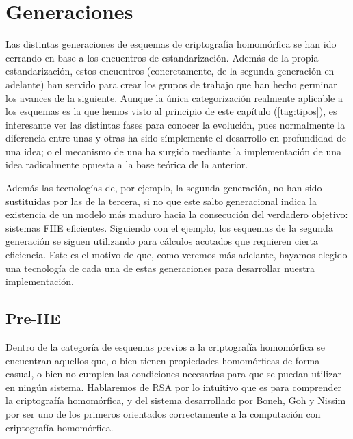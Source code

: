 \section{Generaciones}

Las distintas generaciones de esquemas de criptografía homomórfica se han ido cerrando en base a los encuentros de estandarización. Además de la propia estandarización, estos encuentros (concretamente, de la segunda generación en adelante) han servido para crear los grupos de trabajo que han hecho germinar los avances de la siguiente. Aunque la única categorización realmente aplicable a los esquemas es la que hemos visto al principio de este capítulo (\ref{tag:tipos}), es interesante ver las distintas fases para conocer la evolución, pues normalmente la diferencia entre unas y otras ha sido símplemente el desarrollo en profundidad de una idea; o el mecanismo de una ha surgido mediante la implementación de una idea radicalmente opuesta a la base teórica de la anterior.


Además las tecnologías de, por ejemplo, la segunda generación, no han sido sustituidas por las de la tercera, si no que este salto generacional indica la existencia de un modelo más maduro hacia la consecución del verdadero objetivo: sistemas FHE eficientes. Siguiendo con el ejemplo, los esquemas de la segunda generación se siguen utilizando para cálculos acotados que requieren cierta eficiencia. Este es el motivo de que, como veremos más adelante, hayamos elegido una tecnología de cada una de estas generaciones para desarrollar nuestra implementación.

\subsection{Pre-HE}

Dentro de la categoría de esquemas previos a la criptografía homomórfica se encuentran aquellos que, o bien tienen propiedades homomórficas de forma casual, o bien no cumplen las condiciones necesarias para que se puedan utilizar en ningún sistema. Hablaremos de RSA por lo intuitivo que es para comprender la criptografía homomórfica, y del sistema desarrollado por Boneh, Goh y Nissim por ser uno de los primeros orientados correctamente a la computación con criptografía homomórfica.

